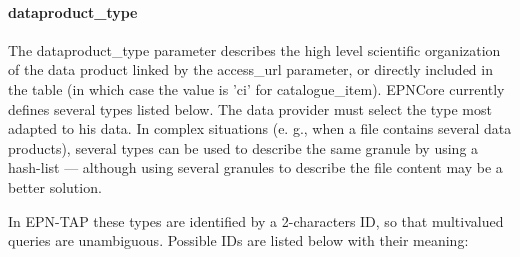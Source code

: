 \documentclass[11pt,a4paper]{ivoa}
\begin{document}
\paragraph{dataproduct\_type}

The dataproduct\_type parameter describes the high level scientific organization of the data product linked by the access\_url parameter, or directly included in the table (in which case the value is 'ci' for catalogue\_item). EPNCore currently defines several types listed below. The data provider must select the type most adapted to his data. In complex situations (e. g., when a file contains several data products), several types can be used to describe the same granule by using a hash-list — although using several granules to describe the file content may be a better solution.  

In EPN-TAP these types are identified by a 2-characters ID, so that multivalued queries are unambiguous. Possible IDs are listed below with their meaning:
\end{document}
